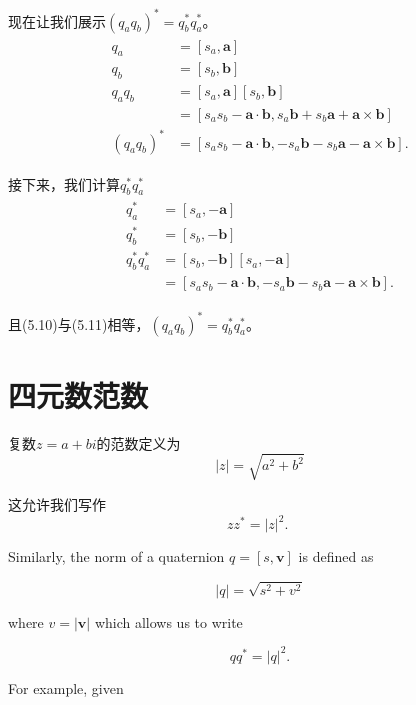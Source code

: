 现在让我们展示$\left(q_{a} q_{b}\right)^{*}=q_{b}^{*} q_{a}^{*}$。
\begin{align}
    \begin{aligned}
        q_{a} & =\left[s_{a}, \mathbf{a}\right] \\
        q_{b} & =\left[s_{b}, \mathbf{b}\right] \\
        q_{a} q_{b} & =\left[s_{a}, \mathbf{a}\right]\left[s_{b}, \mathbf{b}\right] \\
        & =\left[s_{a} s_{b}-\mathbf{a} \cdot \mathbf{b}, s_{a} \mathbf{b}+s_{b} \mathbf{a}+\mathbf{a} \times \mathbf{b}\right] \\
        \left(q_{a} q_{b}\right)^{*} & =\left[s_{a} s_{b}-\mathbf{a} \cdot \mathbf{b},-s_{a} \mathbf{b}-s_{b} \mathbf{a}-\mathbf{a} \times \mathbf{b}\right] .
    \end{aligned}
\end{align}

接下来，我们计算$q_{b}^{*} q_{a}^{*}$
\begin{align}
    \begin{aligned}
        q_{a}^{*} & =\left[s_{a},-\mathbf{a}\right] \\
        q_{b}^{*} & =\left[s_{b},-\mathbf{b}\right] \\
        q_{b}^{*} q_{a}^{*} & =\left[s_{b},-\mathbf{b}\right]\left[s_{a},-\mathbf{a}\right] \\
        & =\left[s_{a} s_{b}-\mathbf{a} \cdot \mathbf{b},-s_{a} \mathbf{b}-s_{b} \mathbf{a}-\mathbf{a} \times \mathbf{b}\right] .
    \end{aligned}
\end{align}

且(5.10)与(5.11)相等，$\left(q_{a} q_{b}\right)^{*}=q_{b}^{*} q_{a}^{*}$。

\section{四元数范数}
复数$z=a+ bi $的范数定义为
$$
|z|=\sqrt{a^{2}+b^{2}}
$$

这允许我们写作
$$
z z^{*}=|z|^{2} \text {. }
$$

Similarly, the norm of a quaternion $q=[s, \mathbf{v}]$ is defined as

$$
|q|=\sqrt{s^{2}+v^{2}}
$$

where $v=|\mathbf{v}|$ which allows us to write

$$
q q^{*}=|q|^{2} .
$$

For example, given

